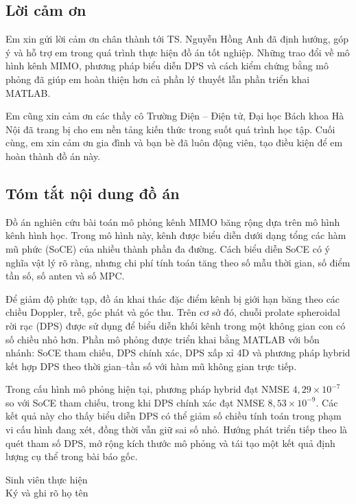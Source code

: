 \thispagestyle{empty}

\subsection*{\centering Lời cảm ơn}

Em xin gửi lời cảm ơn chân thành tới TS. Nguyễn Hồng Anh đã định hướng, góp ý và hỗ trợ em trong quá trình thực hiện đồ án tốt nghiệp. Những trao đổi về mô hình kênh MIMO, phương pháp biểu diễn DPS và cách kiểm chứng bằng mô phỏng đã giúp em hoàn thiện hơn cả phần lý thuyết lẫn phần triển khai MATLAB.

Em cũng xin cảm ơn các thầy cô Trường Điện -- Điện tử, Đại học Bách khoa Hà Nội đã trang bị cho em nền tảng kiến thức trong suốt quá trình học tập. Cuối cùng, em xin cảm ơn gia đình và bạn bè đã luôn động viên, tạo điều kiện để em hoàn thành đồ án này.

\subsection*{\centering Tóm tắt nội dung đồ án}

Đồ án nghiên cứu bài toán mô phỏng kênh MIMO băng rộng dựa trên mô hình kênh hình học. Trong mô hình này, kênh được biểu diễn dưới dạng tổng các hàm mũ phức (SoCE) của nhiều thành phần đa đường. Cách biểu diễn SoCE có ý nghĩa vật lý rõ ràng, nhưng chi phí tính toán tăng theo số mẫu thời gian, số điểm tần số, số anten và số MPC.

Để giảm độ phức tạp, đồ án khai thác đặc điểm kênh bị giới hạn băng theo các chiều Doppler, trễ, góc phát và góc thu. Trên cơ sở đó, chuỗi prolate spheroidal rời rạc (DPS) được sử dụng để biểu diễn khối kênh trong một không gian con có số chiều nhỏ hơn. Phần mô phỏng được triển khai bằng MATLAB với bốn nhánh: SoCE tham chiếu, DPS chính xác, DPS xấp xỉ 4D và phương pháp hybrid kết hợp DPS theo thời gian--tần số với hàm mũ không gian trực tiếp.

Trong cấu hình mô phỏng hiện tại, phương pháp hybrid đạt NMSE \(4{,}29\times10^{-7}\) so với SoCE tham chiếu, trong khi DPS chính xác đạt NMSE \(8{,}53\times10^{-9}\). Các kết quả này cho thấy biểu diễn DPS có thể giảm số chiều tính toán trong phạm vi cấu hình đang xét, đồng thời vẫn giữ sai số nhỏ. Hướng phát triển tiếp theo là quét tham số DPS, mở rộng kích thước mô phỏng và tái tạo một kết quả định lượng cụ thể trong bài báo gốc.

\vfill
\begin{flushright}
    \begin{minipage}{0.42\textwidth}
        \centering
        Sinh viên thực hiện\\
        {\fontsize{10pt}{12pt}\selectfont Ký và ghi rõ họ tên}
    \end{minipage}
\end{flushright}
  
\cleardoublepage
